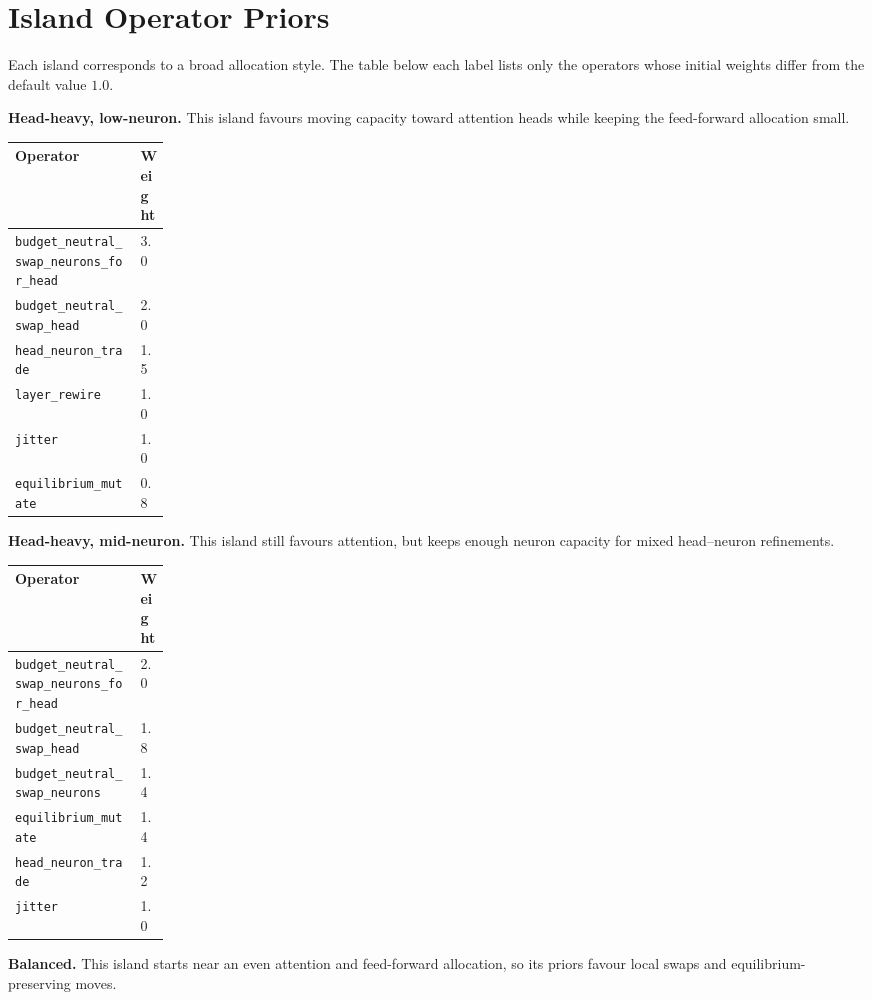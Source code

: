 ﻿\documentclass[10pt,twocolumn]{article}
\newcommand{\code}[1]{\texttt{\fontsize{8.1}{9.3}\selectfont #1}}
\newenvironment{hptable}{%
  \begin{tcolorbox}[tablebox]
  \footnotesize
  \renewcommand{\arraystretch}{1.12}
  \setlength{\tabcolsep}{3.0pt}
}{%
  \end{tcolorbox}
}
\begin{document}
\section{Island Operator Priors}
Each island corresponds to a broad allocation style. The table below each label lists only the operators whose initial weights differ from the default value $1.0$.

\textbf{Head-heavy, low-neuron.} This island favours moving capacity toward attention heads while keeping the feed-forward allocation small.

\begin{hptable}
\begin{tabularx}{\linewidth}{@{}Y M{0.18\linewidth}@{}}
\toprule
\textbf{Operator} & \textbf{Weight} \\
\midrule
\code{budget\_neutral\_swap\_neurons\_for\_head} & 3.0 \\
\code{budget\_neutral\_swap\_head} & 2.0 \\
\code{head\_neuron\_trade} & 1.5 \\
\code{layer\_rewire} & 1.0 \\
\code{jitter} & 1.0 \\
\code{equilibrium\_mutate} & 0.8 \\
\bottomrule
\end{tabularx}
\end{hptable}

\textbf{Head-heavy, mid-neuron.} This island still favours attention, but keeps enough neuron capacity for mixed head--neuron refinements.

\begin{hptable}
\begin{tabularx}{\linewidth}{@{}Y M{0.18\linewidth}@{}}
\toprule
\textbf{Operator} & \textbf{Weight} \\
\midrule
\code{budget\_neutral\_swap\_neurons\_for\_head} & 2.0 \\
\code{budget\_neutral\_swap\_head} & 1.8 \\
\code{budget\_neutral\_swap\_neurons} & 1.4 \\
\code{equilibrium\_mutate} & 1.4 \\
\code{head\_neuron\_trade} & 1.2 \\
\code{jitter} & 1.0 \\
\bottomrule
\end{tabularx}
\end{hptable}

\textbf{Balanced.} This island starts near an even attention and feed-forward allocation, so its priors favour local swaps and equilibrium-preserving moves.
\end{document}
